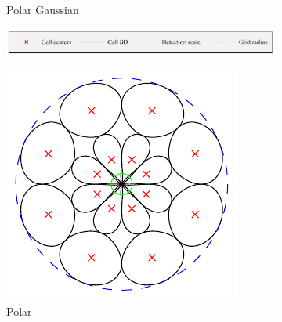 \documentclass[thesis.tex]{subfiles}
\begin{document}
\begin{figure}[p]
\begin{subfigure}[t]{0.40\textwidth}
		\caption{Polar Gaussian}
		\label{fig:cellWindowPolar}
	\end{subfigure}
	\caption{The two types of Gaussian cell aperture functions plotted in 3-D. The black curves are placed 1 standard deviation $\sigma$ from the cell centers. The yellow curves are placed $3 \sigma$ from the cell centers and confine the regions used to calculate the cell histograms.}
	\label{fig:gridWindow}
	\vspace{2mm}
	\begin{subfigure}[t]{\textwidth}
		\centering
		\includegraphics[width=\textwidth]{img/gridType_legend.pdf}
	\end{subfigure}
	\begin{subfigure}[t]{0.30\textwidth}
		\includegraphics[width=\textwidth]{img/gridType_polar_polar_gaussian.pdf}
		\caption{Polar}
		\label{fig:gridTypeP}
	\end{subfigure}
	\begin{subfigure}[t]{0.30\textwidth}

\end{subfigure}
\end{figure}
\end{document}
